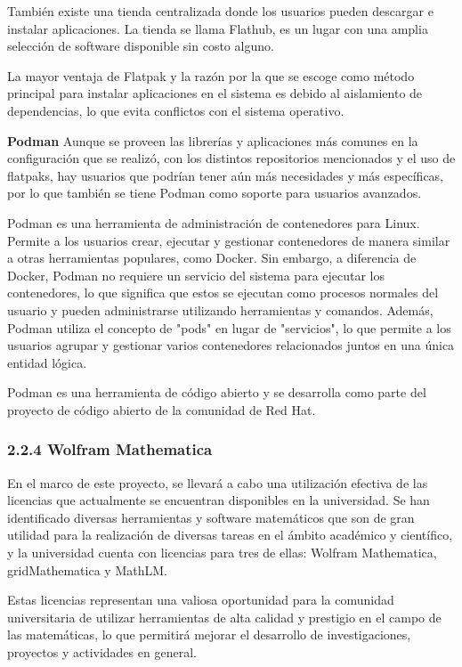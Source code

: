 \begin{doublespace}
\begin{multicols}{2}
    También existe una tienda centralizada donde los usuarios pueden descargar e instalar aplicaciones. La tienda se llama Flathub, es un lugar con una amplia selección de software disponible sin costo alguno.

    La mayor ventaja de Flatpak y la razón por la que se escoge como método principal para instalar aplicaciones en el sistema es debido al aislamiento de dependencias, lo que evita conflictos con el sistema operativo. \cite{FLAT-1} \cite{FLAT-2} \cite{RHEL-FLAT-1} \cite{PHOENIX-FLAT-1}

    \textbf{Podman}
    \newline
    Aunque se proveen las librerías y aplicaciones más comunes en la configuración que se realizó, con los distintos repositorios mencionados y el uso de flatpaks, hay usuarios que podrían tener aún más necesidades y más específicas, por lo que también se tiene Podman como soporte para usuarios avanzados.

    Podman es una herramienta de administración de contenedores para Linux. Permite a los usuarios crear, ejecutar y gestionar contenedores de manera similar a otras herramientas populares, como Docker. Sin embargo, a diferencia de Docker, Podman no requiere un servicio del sistema para ejecutar los contenedores, lo que significa que estos se ejecutan como procesos normales del usuario y pueden administrarse utilizando herramientas y comandos. Además, Podman utiliza el concepto de "pods" en lugar de "servicios", lo que permite a los usuarios agrupar y gestionar varios contenedores relacionados juntos en una única entidad lógica. 
    
    Podman es una herramienta de código abierto y se desarrolla como parte del proyecto de código abierto de la comunidad de Red Hat. \cite{RHEL-podman-1}

    \subsubsection{2.2.4 Wolfram Mathematica}

    En el marco de este proyecto, se llevará a cabo una utilización efectiva de las licencias que actualmente se encuentran disponibles en la universidad. Se han identificado diversas herramientas y software matemáticos que son de gran utilidad para la realización de diversas tareas en el ámbito académico y científico, y la universidad cuenta con licencias para tres de ellas: Wolfram Mathematica, gridMathematica y MathLM.

    Estas licencias representan una valiosa oportunidad para la comunidad universitaria de utilizar herramientas de alta calidad y prestigio en el campo de las matemáticas, lo que permitirá mejorar el desarrollo de investigaciones, proyectos y actividades en general.
    

\end{multicols}
\end{doublespace}
